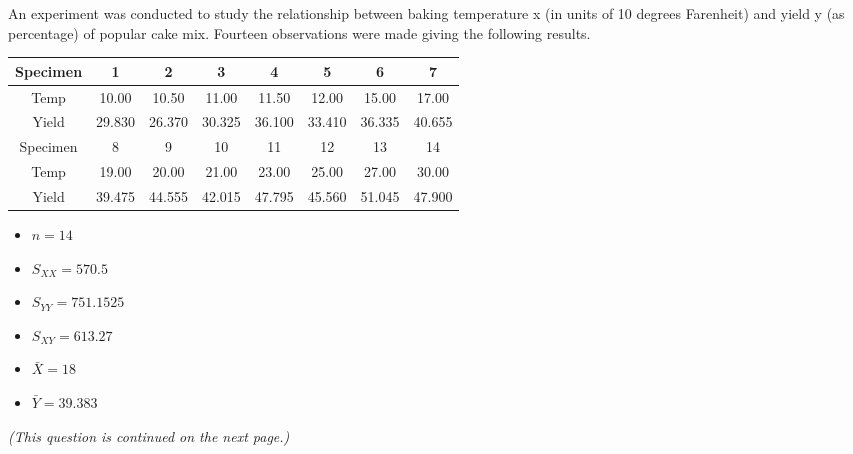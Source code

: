 \item An experiment was conducted to study the relationship between baking temperature x (in units of 10 degrees Farenheit) and yield y (as percentage) of popular cake mix. Fourteen observations were made giving the following results.





\begin{center}
	\begin{tabular}{|c||c|c|c|c|c|c|c|}
		\hline
		Specimen & 1 & 2 & 3 & 4 & 5 & 6 & 7 \\ \hline
		\hline
		Temp &  10.00 & 10.50 & 11.00 & 11.50 & 12.00 & 15.00 & 17.00 \\ \hline 
		Yield &  29.830&  26.370 & 30.325 &36.100 &33.410 &36.335 & 40.655 \\ \hline 
		\hline\hline
		Specimen & 8 & 9 & 10 & 11 & 12 & 13 & 14 \\  \hline
		Temp &  19.00 & 20.00 & 21.00 & 23.00 & 25.00 & 27.00 & 30.00 \\ \hline
		Yield &  39.475& 44.555&  42.015 & 47.795 & 45.560&  51.045 & 47.900 \\ \hline 
		\hline
	\end{tabular}
\end{center}

\begin{multicols}{3}
	\begin{itemize}
		\item $n=14$
		\item $S_{XX} = 570.5$
		\item $S_{YY} =  751.1525$
		\item $S_{XY} = 613.27$
		\item $\bar{X} = 18$
		\item $\bar{Y} = 39.383$
	\end{itemize}
\end{multicols}
\medskip
\textit{(This question is continued on the next page.)}
\newpage
